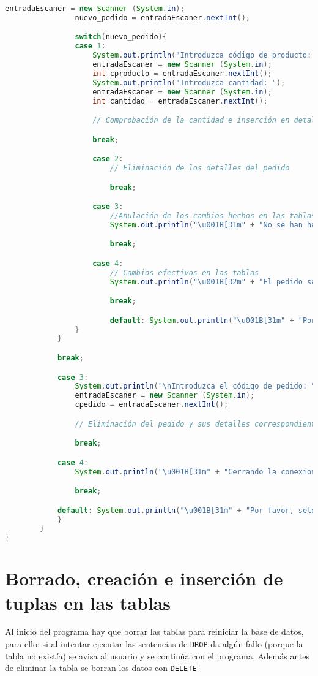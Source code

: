\begin{lstlisting}[language=Java]
				entradaEscaner = new Scanner (System.in);
				nuevo_pedido = entradaEscaner.nextInt();

				switch(nuevo_pedido){
				case 1:
					System.out.println("Introduzca código de producto: ");
					entradaEscaner = new Scanner (System.in);
					int cproducto = entradaEscaner.nextInt();
					System.out.println("Introduzca cantidad: ");
					entradaEscaner = new Scanner (System.in);
					int cantidad = entradaEscaner.nextInt();

					// Comprobación de la cantidad e inserción en detalle pedido

					break;

					case 2:
						// Eliminación de los detalles del pedido

						break;

					case 3:
						//Anulación de los cambios hechos en las tablas
						System.out.println("\u001B[31m" + "No se han hecho efectivos los cambios" + "\u001B[0m");

						break;

					case 4:
						// Cambios efectivos en las tablas
						System.out.println("\u001B[32m" + "El pedido se ha guardado correctamente" + "\u001B[0m");

						break;

						default: System.out.println("\u001B[31m" + "Por favor, seleccione una opcion valida: " + "\u001B[0m");
				}
			}

			break;

			case 3:
				System.out.println("\nIntroduzca el código de pedido: ");
				entradaEscaner = new Scanner (System.in);
				cpedido = entradaEscaner.nextInt();

				// Eliminación del pedido y sus detalles correspondientes

				break;

			case 4:
				System.out.println("\u001B[31m" + "Cerrando la conexion..." + "\u001B[0m");

				break;

			default: System.out.println("\u001B[31m" + "Por favor, seleccione una opcion valida: " + "\u001B[0m");
			}
		}
}
\end{lstlisting}

\section{Borrado, creación e inserción de tuplas en las tablas}

Al inicio del programa hay que borrar las tablas para reiniciar la base de datos, para ello: si al intentar ejecutar las sentencias de \texttt{DROP} da algún fallo (porque la tabla no existía) se avisa al usuario y se continúa con el programa. Además antes de eliminar la tabla se borran los datos con \texttt{DELETE}

